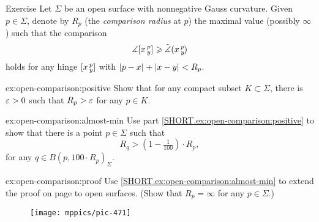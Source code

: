 \begin{thm}{Exercise}\label{ex:open-comparison}
Let $\Sigma$ be an open surface with nonnegative Gauss curvature.
Given $p\in\Sigma$, denote by $R_p$ 
(the \emph{comparison radius} at $p$) 
the maximal value (possibly $\infty$) such that the comparison 
\[\measuredangle[x\,{}^{p}_{y}]
\geqslant\tilde\measuredangle(x\,{}^{p}_{y}\hspace{-0.2ex})\]
holds for any hinge $[x\,{}^{p}_{y}]$ with $\dist{p}{x}{}+\dist{x}{y}{}<R_p$.

\begin{subthm}{ex:open-comparison:positive}
Show that for any compact subset $K\subset \Sigma$, there is $\varepsilon>0$ such that $R_p>\varepsilon$ for any $p\in K$.
\end{subthm}

\begin{subthm}{ex:open-comparison:almost-min}
Use part \ref{SHORT.ex:open-comparison:positive} to show that 
there is a point $p\in\Sigma$ such that 
\[R_q>(1-\tfrac1{100})\cdot R_p,\]
for any $q\in B(p,100\cdot R_p)_\Sigma$.
\end{subthm}

\begin{subthm}{ex:open-comparison:proof}
Use \ref{SHORT.ex:open-comparison:almost-min} to extend the proof on page \pageref{proof(thm:comp:toponogov)} to open surfaces. 
(Show that $R_p=\infty$ for any $p\in\Sigma$.) 
\end{subthm}


\end{thm}


\begin{wrapfigure}{r}{30 mm}
\vskip-0mm
\centering
\texttt{[image: mppics/pic-471]}
\end{wrapfigure}

